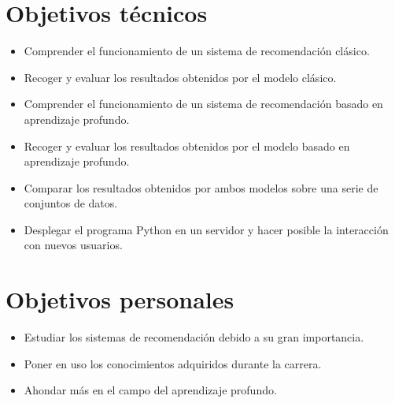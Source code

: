 
\section{Objetivos técnicos}\label{objetivos-tecnicos}
\begin{itemize}
\tightlist
\item Comprender el funcionamiento de un sistema de recomendación clásico.
\item Recoger y evaluar los resultados obtenidos por el modelo clásico.
\item Comprender el funcionamiento de un sistema de recomendación basado en aprendizaje profundo.
\item Recoger y evaluar los resultados obtenidos por el modelo basado en aprendizaje profundo.
\item Comparar los resultados obtenidos por ambos modelos sobre una serie de conjuntos de datos.
\item Desplegar el programa Python en un servidor y hacer posible la interacción con nuevos usuarios.
\end{itemize}

\section{Objetivos personales}\label{objetivos-personales}
\begin{itemize}
\tightlist
\item Estudiar los sistemas de recomendación debido a su gran importancia.
\item Poner en uso los conocimientos adquiridos durante la carrera.
\item Ahondar más en el campo del aprendizaje profundo.
\end{itemize}



